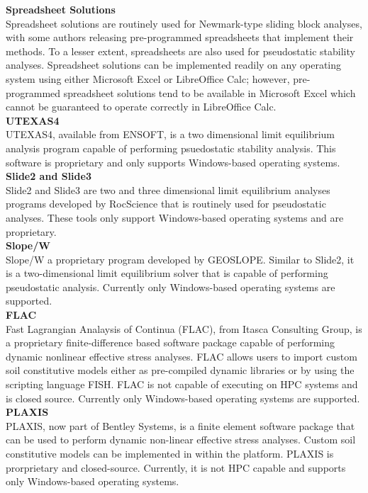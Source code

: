 \noindent\textbf{Spreadsheet Solutions}\\
Spreadsheet solutions are routinely used for Newmark-type sliding block analyses, with some authors releasing pre-programmed spreadsheets that implement their methods. To a lesser extent, spreadsheets are also used for pseudostatic stability analyses. Spreadsheet solutions can be implemented readily on any operating system using either Microsoft Excel or LibreOffice Calc; however, pre-programmed spreadsheet solutions tend to be available in Microsoft Excel which cannot be guaranteed to operate correctly in LibreOffice Calc.\\

\noindent\textbf{UTEXAS4}\\
UTEXAS4, available from ENSOFT, is a two dimensional limit equilibrium analysis program capable of performing psuedostatic stability analysis. This software is proprietary and only supports Windows-based operating systems.\\

\noindent\textbf{Slide2 and Slide3}\\
Slide2 and Slide3 are two and three dimensional limit equilibrium analyses programs developed by RocScience that is routinely used for pseudostatic analyses. These tools only support Windows-based operating systems and are proprietary.\\

\noindent\textbf{Slope/W}\\
Slope/W a proprietary program developed by GEOSLOPE. Similar to Slide2, it is a two-dimensional limit equilibrium solver that is capable of performing pseudostatic analysis. Currently only Windows-based operating systems are supported.\\

\noindent\textbf{FLAC}\\
Fast Lagrangian Analaysis of Continua (FLAC), from Itasca Consulting Group, is a proprietary finite-difference based software package capable of performing dynamic nonlinear effective stress analyses. FLAC allows users to import custom soil constitutive models either as pre-compiled dynamic libraries or by using the scripting language FISH. FLAC is not capable of executing on HPC systems and is closed source. Currently only Windows-based operating systems are supported.\\

\noindent\textbf{PLAXIS}\\
PLAXIS, now part of Bentley Systems, is a finite element software package that can be used to perform dynamic non-linear effective stress analyses. Custom soil constitutive models can be implemented in within the platform. PLAXIS is prorprietary and closed-source. Currently, it is not HPC capable and supports only Windows-based operating systems.\\

